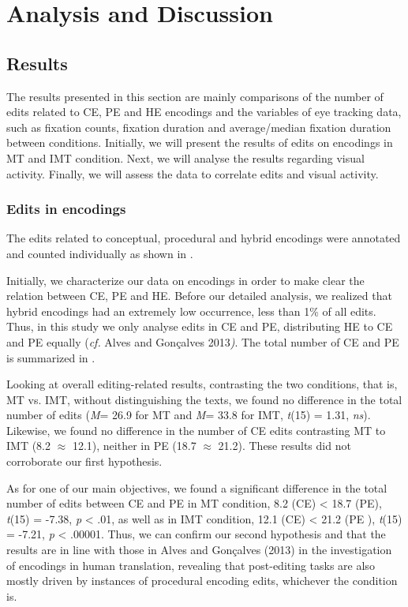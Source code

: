 \documentclass[output=paper]{langsci/langscibook}
\begin{document}
\section{Analysis and Discussion}

\subsection{Results }

The results presented in this section are mainly comparisons of the number of edits related to CE, PE and HE encodings and the variables of eye tracking data, such as fixation counts, fixation duration and average/median fixation duration between conditions. Initially, we will present the results of edits on encodings in MT and IMT condition. Next, we will analyse the results regarding visual activity. Finally, we will assess the data to correlate edits and visual activity. 

\subsubsection{Edits in encodings}

The edits related to conceptual, procedural and hybrid encodings were annotated and counted individually as shown in .


Initially, we characterize our data on encodings in order to make clear the relation between CE, PE and HE.  Before our detailed analysis, we realized that hybrid encodings had an extremely low occurrence, less than 1\% of all edits. Thus, in this study we only analyse edits in CE and PE, distributing HE to CE and PE equally (\textit{cf. }Alves and Gonçalves 2013\textit{)}. The total number of CE and PE is summarized in .



Looking at overall editing-related results, contrasting the two conditions, that is,  MT vs. IMT, without distinguishing the texts, we found no difference in the total number of edits (\textit{M}= 26.9 for MT and \textit{M}= 33.8 for IMT, \textit{t}(15) = 1.31, \textit{ns}). Likewise, we found no difference in the number of CE edits contrasting MT to IMT (8.2 ${\approx}$ 12.1), neither in PE (18.7 ${\approx}$ 21.2). These results did not corroborate our first hypothesis. 



As for one of our main objectives, we found a significant difference in the total number of edits between CE and PE in MT condition, 8.2 (CE) {\textless} 18.7 (PE),               \textit{t}(15) = -7.38, \textit{p} {\textless} .01, as well as in IMT condition, 12.1 (CE) {\textless} 21.2 (PE ), \textit{t}(15) = -7.21,     \textit{p} {\textless} .00001. Thus, we can confirm our second hypothesis and that the results are in line with those in Alves and Gonçalves (2013) in the investigation of encodings in human translation, revealing that post-editing tasks are also mostly driven by instances of procedural encoding edits, whichever the condition is.
\end{document}
